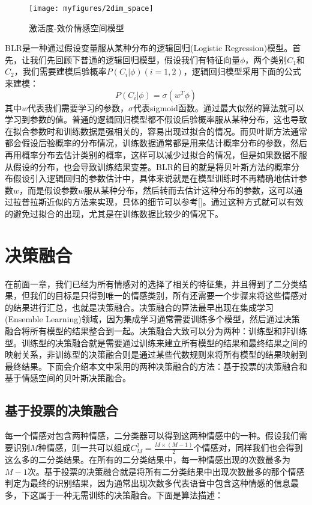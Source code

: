 \begin{figure}[H] %
    \centering
    \texttt{[image: myfigures/2dim\_space]}
    \caption{激活度-效价情感空间模型}
    \label{fig:xfig1}
\end{figure}

 BLR是一种通过假设变量服从某种分布的逻辑回归(Logistic Regression)模型。首先，让我们先回顾下普通的逻辑回归模型，假设我们有特征向量$\phi$，两个类别$C_1$和$C_2$，我们需要建模后验概率$P(C_i|\phi)(i=1,2)$，逻辑回归模型采用下面的公式来建模：
 \begin{equation}
\label{equ:lagrange_multiplier}
    P(C_i|\phi) = \sigma(w^T\phi)
\end{equation}
其中$w$代表我们需要学习的参数，$\sigma$代表sigmoid函数。通过最大似然的算法就可以学习到参数的值。普通的逻辑回归模型都不假设后验概率服从某种分布，这也导致在拟合参数时和训练数据是强相关的，容易出现过拟合的情况。而贝叶斯方法通常都会假设后验概率的分布情况，训练数据通常都是用来估计概率分布的参数，然后再用概率分布去估计类别的概率，这样可以减少过拟合的情况，但是如果数据不服从假设的分布，也会导致训练结果变差。BLR的目的就是将贝叶斯方法的概率分布假设引入逻辑回归的参数估计中，具体来说就是在模型训练时不再精确地估计参数$w$，而是假设参数$w$服从某种分布，然后转而去估计这种分布的参数，这可以通过拉普拉斯近似的方法来实现，具体的细节可以参考[]。通过这种方式就可以有效的避免过拟合的出现，尤其是在训练数据比较少的情况下。

\section{决策融合}
\label{sec:decision_fusion}
在前面一章，我们已经为所有情感对的选择了相关的特征集，并且得到了二分类结果，但我们的目标是只得到唯一的情感类别，所有还需要一个步骤来将这些情感对的结果进行汇总，也就是决策融合。决策融合的算法最早出现在集成学习(Ensemble Learning)领域，因为集成学习通常需要训练多个模型，然后通过决策融合将所有模型的结果整合到一起。决策融合大致可以分为两种：训练型和非训练型。训练型的决策融合就是需要通过训练来建立所有模型的结果和最终结果之间的映射关系，非训练型的决策融合则是通过某些代数规则来将所有模型的结果映射到最终结果。下面会介绍本文中采用的两种决策融合的方法：基于投票的决策融合和基于情感空间的贝叶斯决策融合。

\subsection{基于投票的决策融合}
\label{ssec:voting_decision_fusion}
每一个情感对包含两种情感，二分类器可以得到这两种情感中的一种。假设我们需要识别$M$种情感，则一共可以组成$C_M^2 = \frac{M \times (M - 1)}{2}$个情感对，同样我们也会得到这么多的二分类结果。在所有的二分类结果中，每一种情感出现的次数最多为$M-1$次。基于投票的决策融合就是将所有二分类结果中出现次数最多的那个情感判定为最终的识别结果，因为通常出现次数多代表语音中包含这种情感的信息最多，下这属于一种无需训练的决策融合。下面是算法描述：

